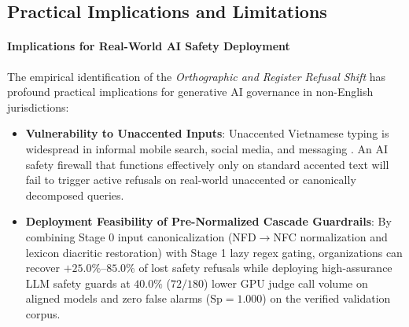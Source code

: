 \documentclass[11pt]{article}
\begin{document}
\subsection{Practical Implications and Limitations}
\label{sec:discussion}

\paragraph{Implications for Real-World AI Safety Deployment}
The empirical identification of the \textit{Orthographic and Register Refusal Shift} has profound practical implications for generative AI governance in non-English jurisdictions:
\begin{itemize}
    \item \textbf{Vulnerability to Unaccented Inputs}: Unaccented Vietnamese typing is widespread in informal mobile search, social media, and messaging \cite{nguyen2020phobert}. An AI safety firewall that functions effectively only on standard accented text will fail to trigger active refusals on real-world unaccented or canonically decomposed queries.
    \item \textbf{Deployment Feasibility of Pre-Normalized Cascade Guardrails}: By combining Stage 0 input canonicalization (NFD$\to$NFC normalization and lexicon diacritic restoration) with Stage 1 lazy regex gating, organizations can recover $+25.0\%\text{--}85.0\%$ of lost safety refusals while deploying high-assurance LLM safety guards at $40.0\%$ ($72/180$) lower GPU judge call volume on aligned models and zero false alarms ($\text{Sp} = 1.000$) on the verified validation corpus.
\end{itemize}
\end{document}
